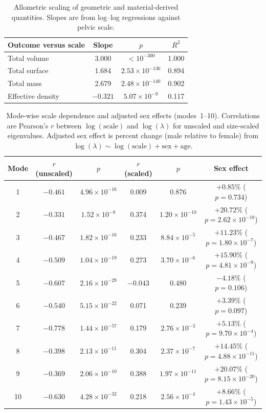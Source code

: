 \documentclass[openacc]{rsproca_new}
\begin{document}
\begin{table}[p]
\centering
\caption{Allometric scaling of geometric and material-derived quantities. Slopes are from log--log regressions against pelvic scale.}
\label{tab:allometry}
\begin{tabular}{lccc}
\toprule
Outcome versus scale & Slope & $p$ & $R^2$ \\
\midrule
Total volume & 3.000 & $<10^{-300}$ & 1.000 \\
Total surface & 1.684 & $2.53 \times 10^{-136}$ & 0.894 \\
Total mass & 2.679 & $2.48 \times 10^{-140}$ & 0.902 \\
Effective density & $-0.321$ & $5.07 \times 10^{-9}$ & 0.117 \\
\bottomrule
\end{tabular}
\end{table}

\begin{table}[p]
\centering
\caption{Mode-wise scale dependence and adjusted sex effects (modes~1--10). Correlations are Pearson's $r$ between $\log(\mathrm{scale})$ and $\log(\lambda)$ for unscaled and size-scaled eigenvalues. Adjusted sex effect is percent change (male relative to female) from $\log(\lambda) \sim \log(\mathrm{scale}) + \mathrm{sex} + \mathrm{age}$.}
\label{tab:modes}
\begin{tabular}{cccccc}
\toprule
Mode & $r$ (unscaled) & $p$ & $r$ (scaled) & $p$ & Sex effect \\
\midrule
1 & $-0.461$ & $4.96 \times 10^{-16}$ & 0.009 & 0.876 & $+0.85\%$ ($p=0.734$) \\
2 & $-0.331$ & $1.52 \times 10^{-8}$ & 0.374 & $1.20 \times 10^{-10}$ & $+20.72\%$ ($p=2.62 \times 10^{-18}$) \\
3 & $-0.467$ & $1.82 \times 10^{-16}$ & 0.233 & $8.84 \times 10^{-5}$ & $+11.23\%$ ($p=1.80 \times 10^{-7}$) \\
4 & $-0.509$ & $1.04 \times 10^{-19}$ & 0.273 & $3.70 \times 10^{-6}$ & $+15.90\%$ ($p=4.81 \times 10^{-9}$) \\
5 & $-0.607$ & $2.16 \times 10^{-29}$ & $-0.043$ & 0.480 & $-4.18\%$ ($p=0.106$) \\
6 & $-0.540$ & $5.15 \times 10^{-22}$ & 0.071 & 0.239 & $+3.39\%$ ($p=0.097$) \\
7 & $-0.778$ & $1.44 \times 10^{-57}$ & 0.179 & $2.76 \times 10^{-3}$ & $+5.13\%$ ($p=9.70 \times 10^{-4}$) \\
8 & $-0.398$ & $2.13 \times 10^{-11}$ & 0.304 & $2.37 \times 10^{-7}$ & $+14.45\%$ ($p=4.88 \times 10^{-11}$) \\
9 & $-0.369$ & $2.06 \times 10^{-10}$ & 0.388 & $1.97 \times 10^{-11}$ & $+20.07\%$ ($p=8.15 \times 10^{-20}$) \\
10 & $-0.630$ & $4.28 \times 10^{-32}$ & 0.218 & $2.56 \times 10^{-4}$ & $+8.66\%$ ($p=1.43 \times 10^{-5}$) \\
\bottomrule
\end{tabular}
\end{table}
\end{document}
